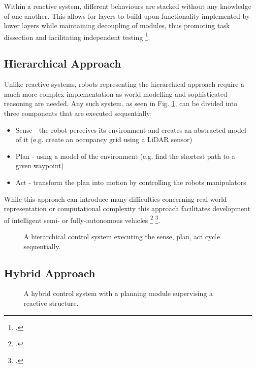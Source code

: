 Within a reactive system, different behaviours are stacked without any knowledge of one another. This allows for layers to build upon functionality implemented by lower layers while maintaining decoupling of modules, thus promoting task dissection and facilitating independent testing \footcite{faigl2017controlParadigms}.


\subsection{Hierarchical Approach}
Unlike reactive systems, robots representing the hierarchical approach require a much more complex implementation as world modelling and sophisticated reasoning are needed. 
Any such system, as seen in Fig. \ref{fig:hierarchicalApproach}, can be divided into three components that are executed sequentially:
\begin{itemize}
	\item Sense - the robot perceives its environment and creates an abstracted model of it (e.g. create an occupancy grid using a LiDAR sensor)
	\item Plan - using a model of the environment (e.g. find the shortest path to a given waypoint)
	\item Act - transform the plan into motion by controlling the robots manipulators
\end{itemize}

While this approach can introduce many difficulties concerning real-world representation or computational complexity this approach facilitates development of intelligent semi- or fully-autonomous vehicles \footcite{faigl2017controlParadigms} \footcite{burgard2020controlParadigms}.

\begin{figure}
	\centering
	
	\caption{
		A hierarchical control system executing the sense, plan, act cycle sequentially.
	}
	\label{fig:hierarchicalApproach}
\end{figure}

\subsection{Hybrid Approach}

\begin{figure}
	\centering
	
	\caption{
		A hybrid control system with a planning module supervising a reactive structure. 
	}
	\label{fig:hybridApproach}
\end{figure}


